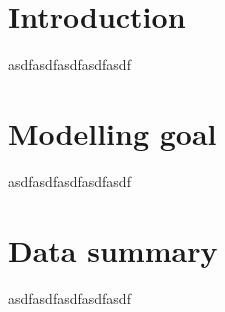 \documentclass[a4paper,11pt]{article}
\begin{document}
	
	\section{Introduction}
	\label{section:intro}
		asdfasdfasdfasdfasdf
	
	\section{Modelling goal}
	\label{section:goal}
		asdfasdfasdfasdfasdf
	
	\section{Data summary}
	\label{section:data}
		asdfasdfasdfasdfasdf
		
\end{document}
